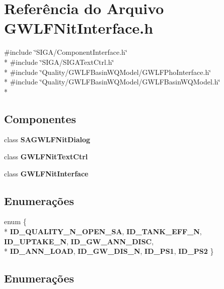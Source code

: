 \section{Referência do Arquivo G\+W\+L\+F\+Nit\+Interface.\+h}
\label{_g_w_l_f_nit_interface_8h}
{\ttfamily \#include \char`\"{}S\+I\+G\+A/\+Component\+Interface.\+h\char`\"{}}\\*
{\ttfamily \#include \char`\"{}S\+I\+G\+A/\+S\+I\+G\+A\+Text\+Ctrl.\+h\char`\"{}}\\*
{\ttfamily \#include \char`\"{}Quality/\+G\+W\+L\+F\+Basin\+W\+Q\+Model/\+G\+W\+L\+F\+Pho\+Interface.\+h\char`\"{}}\\*
{\ttfamily \#include \char`\"{}Quality/\+G\+W\+L\+F\+Basin\+W\+Q\+Model/\+G\+W\+L\+F\+Basin\+W\+Q\+Model.\+h\char`\"{}}\\*
\subsection*{Componentes}
\begin{DoxyCompactItemize}
\item 
class {\bf S\+A\+G\+W\+L\+F\+Nit\+Dialog}
\item 
class {\bf G\+W\+L\+F\+Nit\+Text\+Ctrl}
\item 
class {\bf G\+W\+L\+F\+Nit\+Interface}
\end{DoxyCompactItemize}
\subsection*{Enumerações}
\begin{DoxyCompactItemize}
\item 
enum \{ \\*
{\bf I\+D\+\_\+\+Q\+U\+A\+L\+I\+T\+Y\+\_\+\+N\+\_\+\+O\+P\+E\+N\+\_\+\+SA}, 
{\bf I\+D\+\_\+\+T\+A\+N\+K\+\_\+\+E\+F\+F\+\_\+N}, 
{\bf I\+D\+\_\+\+U\+P\+T\+A\+K\+E\+\_\+N}, 
{\bf I\+D\+\_\+\+G\+W\+\_\+\+A\+N\+N\+\_\+\+D\+I\+SC}, 
\\*
{\bf I\+D\+\_\+\+A\+N\+N\+\_\+\+L\+O\+AD}, 
{\bf I\+D\+\_\+\+G\+W\+\_\+\+D\+I\+S\+\_\+N}, 
{\bf I\+D\+\_\+\+P\+S1}, 
{\bf I\+D\+\_\+\+P\+S2}
 \}
\end{DoxyCompactItemize}


\subsection{Enumerações}

